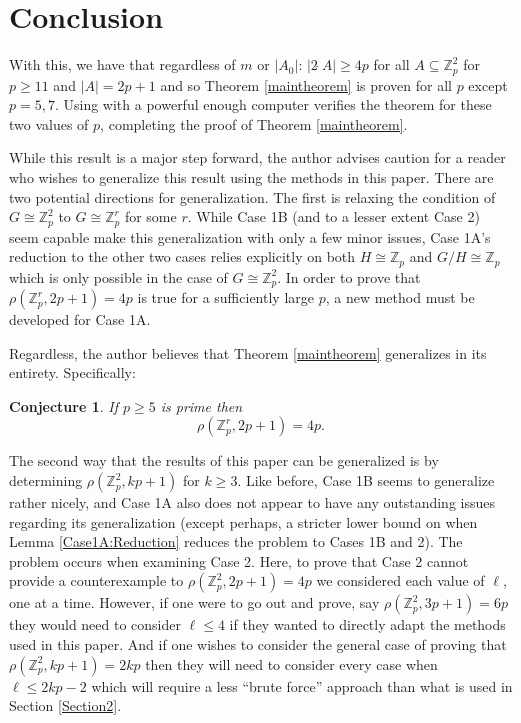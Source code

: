 \documentclass[a4paper, 12pt]{article}\usepackage[english]{babel}
\newtheorem{conj}[thm]{Conjecture}
\newcommand{\Z}{\mathbb{Z}}
\newcommand{\<}{\langle}
\begin{document}
\section{Conclusion}

With this, we have that regardless of $m$ or $|A_0|$: $|2\hat{\;}A|\geq 4p$ for all $A\subseteq \Z_p^2$ for $p\geq 11$ and $|A|=2p+1$ and so Theorem \ref{maintheorem} is proven for all $p$ except $p=5,7$. Using \cite{SumsetGenerator} with a powerful enough computer verifies the theorem for these two values of $p$, completing the proof of Theorem \ref{maintheorem}.

While this result is a major step forward, the author advises caution for a reader who wishes to generalize this result using the methods in this paper. There are two potential directions for generalization. The first is relaxing the condition of $G\cong \Z_p^2$ to $G\cong \Z_p^r$ for some $r$. While Case 1B (and to a lesser extent Case 2) seem capable make this generalization with only a few minor issues, Case 1A's reduction to the other two cases relies explicitly on both $H\cong \Z_p$ and $G/H\cong \Z_p$ which is only possible in the case of $G\cong \Z_p^2$. In order to prove that $\rho(\Z_p^r,2p+1)=4p$ is true for a sufficiently large $p$, a new method must be developed for Case 1A.

Regardless, the author believes that Theorem \ref{maintheorem} generalizes in its entirety. Specifically:
\begin{conj}
    If $p\geq 5$ is prime then \[\rho(\Z_p^r,2p+1)=4p.\]
\end{conj}

The second way that the results of this paper can be generalized is by determining $\rho(\Z_p^2,kp+1)$ for $k\geq 3$. Like before, Case 1B seems to generalize rather nicely, and Case 1A also does not appear to have any outstanding issues regarding its generalization (except perhaps, a stricter lower bound on when Lemma \ref{Case1A:Reduction} reduces the problem to Cases 1B and 2). The problem occurs when examining Case 2. Here, to prove that Case 2 cannot provide a counterexample to $\rho(\Z_p^2,2p+1)=4p$ we considered each value of $\ell$, one at a time. However, if one were to go out and prove, say $\rho(\Z_p^2,3p+1)=6p$ they would need to consider $\ell\leq 4$ if they wanted to directly adapt the methods used in this paper. And if one wishes to consider the general case of proving that $\rho(\Z_p^2,kp+1)=2kp$ then they will need to consider every case when $\ell\leq 2kp-2$ which will require a less ``brute force'' approach than what is used in Section \ref{Section2}.
\end{document}
